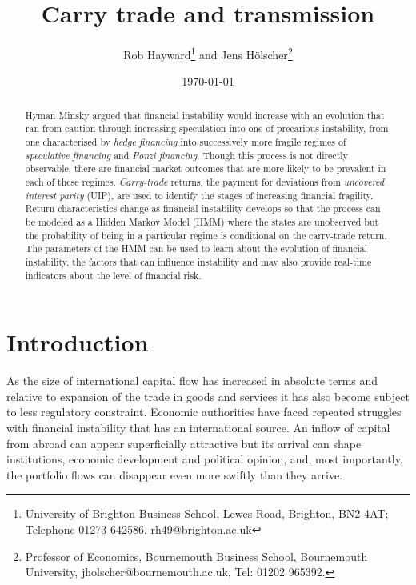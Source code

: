 \documentclass[12pt, a4paper, oneside]{article} %
\begin{document}
\title{Carry trade and transmission}
\author{Rob Hayward\footnote{University of Brighton Business School, Lewes Road, Brighton, BN2 4AT; Telephone 01273 642586.  rh49@brighton.ac.uk} and  Jens H\"{o}lscher\footnote{Professor of Economics, Bournemouth Business School, Bournemouth University, jholscher@bournemouth.ac.uk, Tel: 01202 965392.}} 
\date{\today}
\maketitle
\begin{abstract}
Hyman Minsky argued that financial instability would increase with an evolution that ran from caution through increasing speculation into one of precarious instability, from one characterised by \emph{hedge financing} into successively more fragile regimes of \emph{speculative financing} and \emph{Ponzi financing}.  Though this process is not directly observable, there are financial market outcomes that are more likely to be prevalent in each of these regimes.  \emph{Carry-trade} returns, the payment for deviations from \emph{uncovered interest parity} (UIP), are used to identify the stages of increasing financial fragility.  Return characteristics change as financial instability develops so that the process can be modeled as a Hidden Markov Model (HMM) where the states are unobserved but the probability of being in a particular regime is conditional on the carry-trade return. The parameters of the HMM can be used to learn about the evolution of financial instability, the factors that can influence instability and may also provide real-time indicators about the level of financial risk. 

\end{abstract}

\section{Introduction}
As the size of international capital flow has increased in absolute terms and relative to expansion of the trade in goods and services it has also become subject to less regulatory constraint. Economic authorities have faced repeated struggles with financial instability that has an international source.  An inflow of capital from abroad can appear superficially attractive but its arrival can shape institutions, economic development and political opinion, and, most importantly, the portfolio flows can disappear even more swiftly than they arrive.  %
\end{document}
